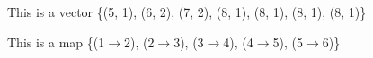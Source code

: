 \documentclass[12pt,fleqn]{tufte-handout}
\begin{document}
This is a vector \{(5, 1), (6, 2), (7, 2), (8, 1), (8, 1), (8, 1), (8, 1)\}

\par This is a map \{(1$\rightarrow$2), (2$\rightarrow$3), (3$\rightarrow$4), (4$\rightarrow$5), (5$\rightarrow$6)\}
\end{document}
